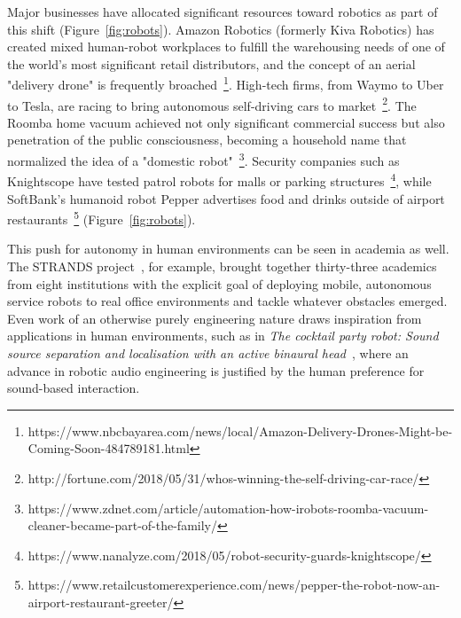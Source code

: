 \documentclass{sfuthesis}
\begin{document}
Major businesses have allocated significant resources toward robotics as part of this shift (Figure~\ref{fig:robots}). Amazon Robotics (formerly Kiva Robotics) has created mixed human-robot workplaces to fulfill the warehousing needs of one of the world's most significant retail distributors, and the concept of an aerial "delivery drone" is frequently broached~\footnote{https://www.nbcbayarea.com/news/local/Amazon-Delivery-Drones-Might-be-Coming-Soon-484789181.html}. High-tech firms, from Waymo to Uber to Tesla, are racing to bring autonomous self-driving cars to market~\footnote{http://fortune.com/2018/05/31/whos-winning-the-self-driving-car-race/}. The Roomba home vacuum achieved not only significant commercial success but also penetration of the public consciousness, becoming a household name that normalized the idea of a "domestic robot"~\footnote{https://www.zdnet.com/article/automation-how-irobots-roomba-vacuum-cleaner-became-part-of-the-family/}. Security companies such as Knightscope have tested patrol robots for malls or parking structures~\footnote{https://www.nanalyze.com/2018/05/robot-security-guards-knightscope/}, while SoftBank's humanoid robot Pepper advertises food and drinks outside of airport restaurants~\footnote{https://www.retailcustomerexperience.com/news/pepper-the-robot-now-an-airport-restaurant-greeter/} (Figure~\ref{fig:robots}).

This push for autonomy in human environments can be seen in academia as well. The STRANDS project~\cite{hawes2017strands}, for example, brought together thirty-three academics from eight institutions with the explicit goal of deploying mobile, autonomous service robots to real office environments and tackle whatever obstacles emerged. Even work of an otherwise purely engineering nature draws inspiration from applications in human environments, such as in \textit{The cocktail party robot: Sound source separation and localisation with an active binaural head}~\cite{deleforge2012cocktail}, where an advance in robotic audio engineering is justified by the human preference for sound-based interaction.
\end{document}
